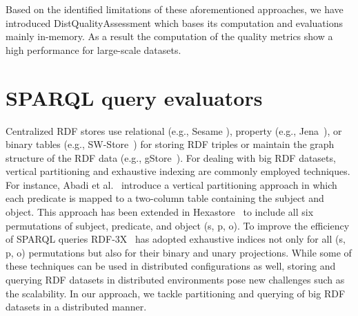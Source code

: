 Based on the identified limitations of these aforementioned approaches, we have introduced DistQualityAssessment which bases its computation and evaluations mainly in-memory.
As a result the computation of the quality metrics show a high performance for large-scale datasets.

\section{SPARQL query evaluators}
Centralized RDF stores use relational (e.g., Sesame \cite{BroekstraKH02}), property (e.g., Jena~\cite{Wilkinson06}), or binary tables (e.g., SW-Store~\cite{AbadiMMH09}) for storing RDF triples or maintain the graph structure of the RDF data (e.g., gStore~\cite{ZouMCOZ11}). 
For dealing with big RDF datasets, vertical partitioning and exhaustive indexing are commonly employed techniques. 
For instance, Abadi et al.~\cite{AbadiMMH07} introduce a vertical partitioning approach in which each predicate is mapped to a two-column table containing the subject and object. 
This approach has been extended in Hexastore~\cite{WeissKB08} to include all six permutations of subject, predicate, and object (s, p, o). 
To improve the efficiency of SPARQL queries RDF-3X~\cite{NeumannW10} has adopted exhaustive indices not only for all (s, p, o) permutations but also for their binary and unary projections. 
While some of these techniques can be used in distributed configurations as well, storing and querying RDF datasets in distributed environments pose new challenges such as the scalability. 
In our approach, we tackle partitioning and querying of big RDF datasets in a distributed manner.

